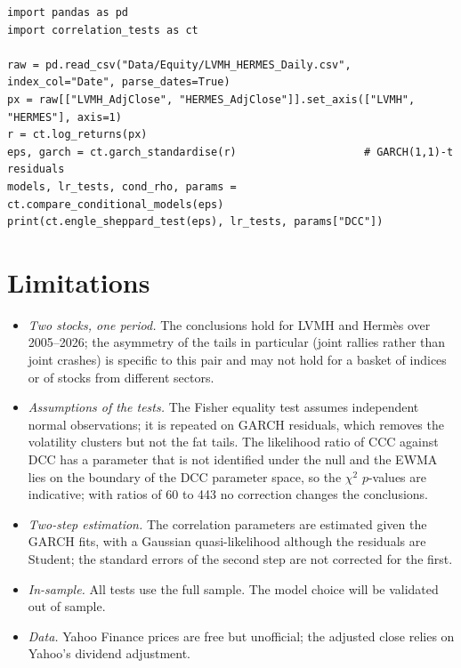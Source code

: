 \documentclass[11pt,a4paper]{article}
\begin{document}
\begin{lstlisting}
import pandas as pd
import correlation_tests as ct

raw = pd.read_csv("Data/Equity/LVMH_HERMES_Daily.csv", index_col="Date", parse_dates=True)
px = raw[["LVMH_AdjClose", "HERMES_AdjClose"]].set_axis(["LVMH", "HERMES"], axis=1)
r = ct.log_returns(px)
eps, garch = ct.garch_standardise(r)                    # GARCH(1,1)-t residuals
models, lr_tests, cond_rho, params = ct.compare_conditional_models(eps)
print(ct.engle_sheppard_test(eps), lr_tests, params["DCC"])
\end{lstlisting}

\section{Limitations}\label{sec:limitations}
\begin{itemize}
\item \emph{Two stocks, one period.} The conclusions hold for LVMH and Hermès over 2005--2026; the asymmetry of the
tails in particular (joint rallies rather than joint crashes) is specific to this pair and may not hold for a basket
of indices or of stocks from different sectors.
\item \emph{Assumptions of the tests.} The Fisher equality test assumes independent normal observations; it is
repeated on GARCH residuals, which removes the volatility clusters but not the fat tails. The likelihood ratio of CCC
against DCC has a parameter that is not identified under the null and the EWMA lies on the boundary of the DCC
parameter space, so the $\chi^2$ $p$-values are indicative; with ratios of 60 to 443 no correction changes the
conclusions.
\item \emph{Two-step estimation.} The correlation parameters are estimated given the GARCH fits, with a Gaussian
quasi-likelihood although the residuals are Student; the standard errors of the second step are not corrected for
the first.
\item \emph{In-sample.} All tests use the full sample. The model choice will be validated out of sample.
\item \emph{Data.} Yahoo Finance prices are free but unofficial; the adjusted close relies on Yahoo's dividend
adjustment.
\end{itemize}

\end{document}
